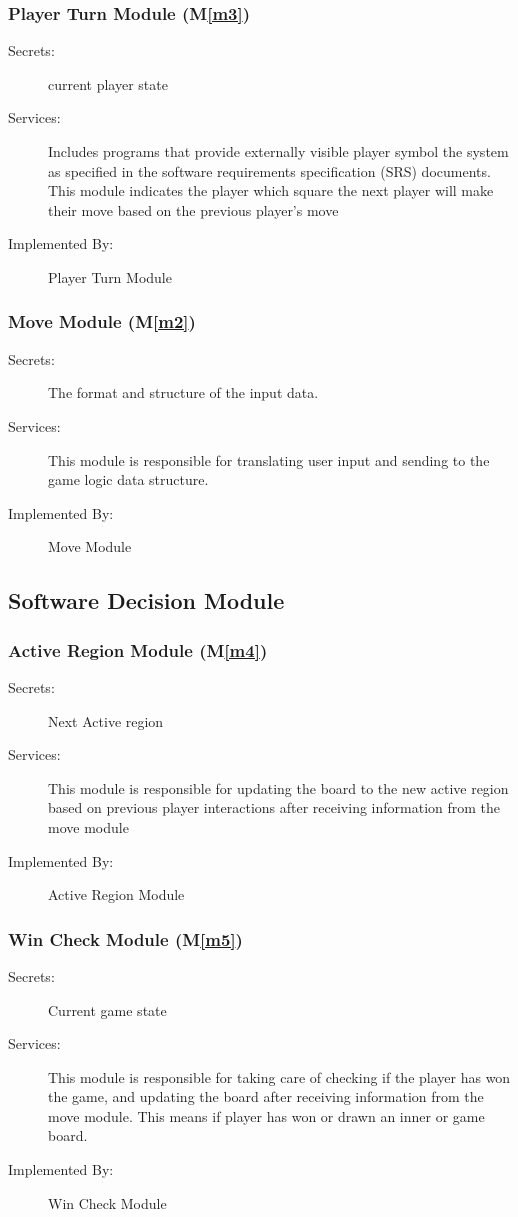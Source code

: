 \documentclass[12pt, titlepage]{article}
\newcommand{\mref}[1]{M\ref{#1}}
\begin{document}
\subsubsection{Player Turn Module (\mref{m3})}
\begin{description}
\item[Secrets:] current player state
\item[Services:]Includes programs that provide externally visible player symbol
  the system as specified in the software requirements specification (SRS)
  documents. This module indicates the player which square the next player will make their move based on the previous player's move
\item[Implemented By:] Player Turn Module
\end{description}

\subsubsection{Move Module (\mref{m2})}
\begin{description}
\item[Secrets:]The format and structure of the input data.
\item[Services:] This module is responsible for translating user input and sending to the game logic data structure.
\item[Implemented By:] Move Module
\end{description}

\subsection{Software Decision Module}
\subsubsection{Active Region Module (\mref{m4})}
\begin{description}
\item[Secrets:] Next Active region
\item[Services:] This module is responsible for updating the board to the new active region based on previous player interactions after receiving information from the move module
\item[Implemented By:] Active Region Module
\end{description}

\subsubsection{Win Check Module (\mref{m5})}
\begin{description}
\item[Secrets:] Current game state
\item[Services:] This module is responsible for taking care of checking if the player has won the game, and updating the board after receiving information from the move module. This means if player has won or drawn an inner or game board.
\item[Implemented By:] Win Check Module
\end{description}
\end{document}

